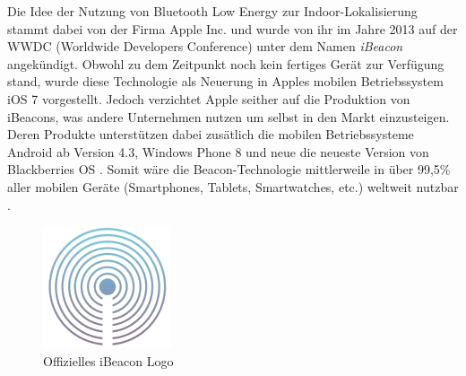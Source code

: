 Die Idee der Nutzung von Bluetooth Low Energy zur Indoor-Lokalisierung stammt dabei von der Firma Apple Inc. und wurde von ihr im Jahre 2013 auf der WWDC (Worldwide Developers Conference)\cite{Apple} unter dem Namen \textit{iBeacon} angekündigt. Obwohl zu dem Zeitpunkt noch kein fertiges Gerät zur Verfügung stand, wurde diese Technologie als Neuerung in Apples mobilen Betriebssystem iOS 7 vorgestellt. Jedoch verzichtet Apple seither auf die Produktion von iBeacons, was andere Unternehmen nutzen um selbst in den Markt einzusteigen. Deren Produkte unterstützen dabei zusätlich die mobilen Betriebssysteme Android ab Version 4.3, Windows Phone 8 und neue die neueste Version von Blackberries OS \cite{Bibel}. Somit wäre die Beacon-Technologie mittlerweile in über 99,5\% aller mobilen Geräte (Smartphones, Tablets, Smartwatches, etc.) weltweit nutzbar \cite{MobGerSt}.\par\bigskip
\begin{figure}[H]
\centering
\includegraphics[scale=0.5]{Bilder/iBeaconLogo.png} 
\caption{Offizielles iBeacon Logo \cite{iLogo}}
\label{iLogo}
\end{figure}

\newpage

